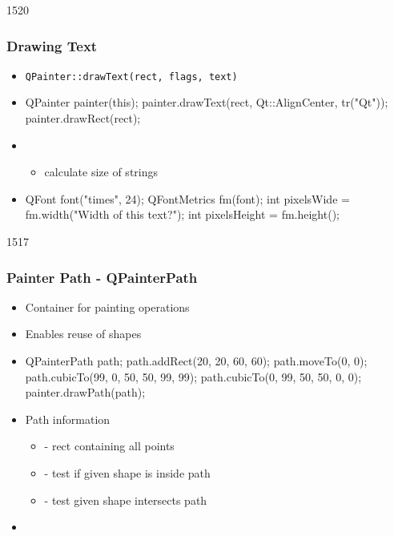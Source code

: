 \begin{slide}[fragile]{1520}\frametitle{Drawing Text}
  \begin{itemize}
  \item \texttt{QPainter::drawText(rect, flags, text)}
  \item[] \begin{cpp}
QPainter painter(this);
painter.drawText(rect, Qt::AlignCenter, tr("Qt"));
painter.drawRect(rect);      
    \end{cpp}
 \item {}
      \begin{itemize}
      \item calculate size of strings
      \end{itemize}
    \item[] \begin{cpp}
QFont font("times", 24);
QFontMetrics fm(font);
int pixelsWide = fm.width("Width of this text?");
int pixelsHeight = fm.height();        
      \end{cpp}
  \end{itemize}
\end{slide}

\begin{slide}[fragile]{1517}\frametitle{Painter Path - QPainterPath}
  \begin{itemize}
  \item Container for painting operations
  \item Enables reuse of shapes
  \item[] \begin{cpp}
QPainterPath path;
path.addRect(20, 20, 60, 60);
path.moveTo(0, 0);
path.cubicTo(99, 0,  50, 50,  99, 99);
path.cubicTo(0, 99,  50, 50,  0, 0);      
painter.drawPath(path);
    \end{cpp}
  \item Path information
    \begin{itemize}
    \item {} - rect containing all points
    \item {} - test if given shape is inside path
    \item {} - test given shape intersects path
    \end{itemize}

  \item[] 

  \end{itemize}

\end{slide}

